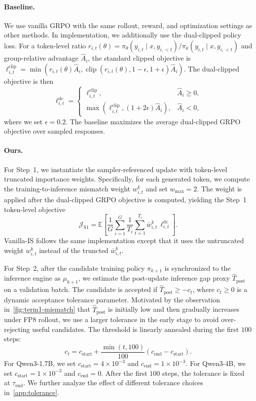 \documentclass{article}
\begin{document}
\paragraph{Baseline.}
We use vanilla GRPO with the same rollout, reward, and optimization settings as other methods. 
In implementation, we additionally use the dual-clipped policy loss. 
For a token-level ratio $r_{i,t}(\theta)=\pi_\theta(y_{i,t}\mid x,y_{i,<t})/\pi_k(y_{i,t}\mid x,y_{i,<t})$ and group-relative advantage $\hat{A}_i$, the standard clipped objective is
$\ell^{\mathrm{clip}}_{i,t}=\min\!\left(r_{i,t}(\theta)\hat{A}_i,\operatorname{clip}(r_{i,t}(\theta),1-\epsilon,1+\epsilon)\hat{A}_i\right)$.
The dual-clipped objective is then
\[
\ell^{\mathrm{dc}}_{i,t}
=
\begin{cases}
\ell^{\mathrm{clip}}_{i,t}, & \hat{A}_i \ge 0,\\
\max\!\left(\ell^{\mathrm{clip}}_{i,t}, (1+2\epsilon)\hat{A}_i\right), & \hat{A}_i < 0,
\end{cases}
\]
where we set $\epsilon=0.2$. 
The baseline maximizes the average dual-clipped GRPO objective over sampled responses.

\paragraph{Ours.}
For Step~1, we instantiate the sampler-referenced update with token-level truncated importance weights. 
Specifically, for each generated token, we compute the training-to-inference mismatch weight $w^k_{i,t}$ and set $w_{\max}=2$. 
The weight is applied after the dual-clipped GRPO objective is computed, yielding the Step~1 token-level objective
\[
\mathcal{J}_{\mathrm{S1}}
=
\mathbb{E}
\left[
\frac{1}{G}
\sum_{i=1}^{G}
\frac{1}{T_i}
\sum_{t=1}^{T_i}
\bar{w}^k_{i,t}\,
\ell^{\mathrm{dc}}_{i,t}
\right].
\]
Vanilla-IS follows the same implementation except that it uses the untruncated weight $w^k_{i,t}$ instead of the truncted $\bar{w}^k_{i,t}$.

For Step~2, after the candidate training policy $\pi_{k+1}$ is synchronized to the inference engine as $\mu_{k+1}$, we estimate the post-update inference gap proxy $\widehat{T}_{\mathrm{post}}$ on a validation batch. 
The candidate is accepted if $\widehat{T}_{\mathrm{post}}\ge -c_t$, where $c_t\ge 0$ is a dynamic acceptance tolerance parameter. 
Motivated by the observation in~\autoref{fig:term1-mismatch} that $\widehat{T}_{\mathrm{post}}$ is initially low and then gradually increases under FP8 rollout, we use a larger tolerance in the early stage to avoid over-rejecting useful candidates. 
The threshold is linearly annealed during the first $100$ steps:
\[
c_t
=
c_{\mathrm{start}}
+
\frac{\min(t,100)}{100}
\left(
c_{\mathrm{end}}-c_{\mathrm{start}}
\right).
\]
For Qwen3-1.7B, we set $c_{\mathrm{start}}=4\times 10^{-3}$ and $c_{\mathrm{end}}=1\times 10^{-3}$.
For Qwen3-4B, we set $c_{\mathrm{start}}=1\times 10^{-3}$ and $c_{\mathrm{end}}=0$.
After the first $100$ steps, the tolerance is fixed at $\tau_{\mathrm{end}}$.
We further analyze the effect of different tolerance choices in~\autoref{app:tolerance}.
\end{document}
